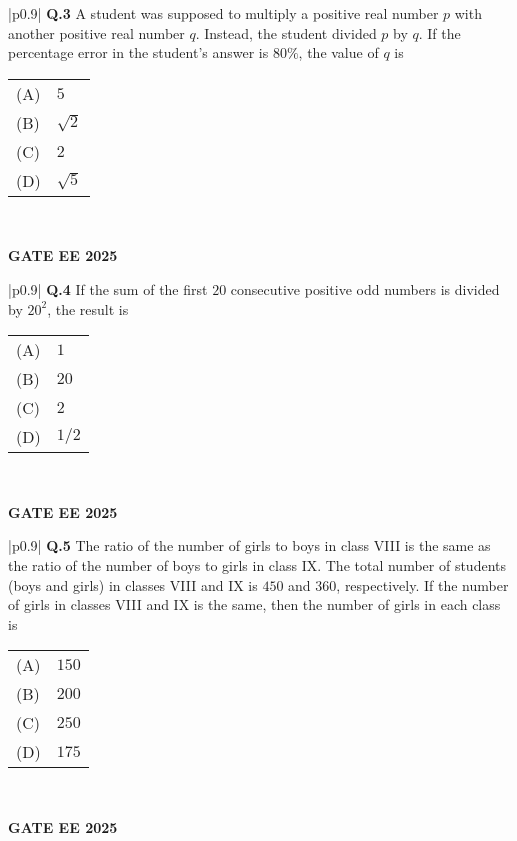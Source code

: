 \documentclass{article}
\begin{document}
\begin{table}[h]
\centering
\begin{tabular}{|p{0.9\linewidth}|}
\hline
\textbf{Q.3} A student was supposed to multiply a positive real number $p$ with another positive real number $q$. Instead, the student divided $p$ by $q$. If the percentage error in the student's answer is $80\%$, the value of $q$ is \\
\hline
\begin{tabular}{ll}
(A) & $5$ \\
(B) & $\sqrt{2}$ \\
(C) & $2$ \\
(D) & $\sqrt{5}$ \\
\end{tabular} \\
\hline
\end{tabular}
\end{table}
\textbf{GATE EE 2025}

\begin{table}[h]
\centering
\begin{tabular}{|p{0.9\linewidth}|}
\hline
\textbf{Q.4} If the sum of the first $20$ consecutive positive odd numbers is divided by $20^2$, the result is \\
\hline
\begin{tabular}{ll}
(A) & $1$ \\
(B) & $20$ \\
(C) & $2$ \\
(D) & $1/2$ \\
\end{tabular} \\
\hline
\end{tabular}
\end{table}
\textbf{GATE EE 2025}

\begin{table}[h]
\centering
\begin{tabular}{|p{0.9\linewidth}|}
\hline
\textbf{Q.5} The ratio of the number of girls to boys in class VIII is the same as the ratio of the number of boys to girls in class IX. The total number of students (boys and girls) in classes VIII and IX is $450$ and $360$, respectively. If the number of girls in classes VIII and IX is the same, then the number of girls in each class is \\
\hline
\begin{tabular}{ll}
(A) & $150$ \\
(B) & $200$ \\
(C) & $250$ \\
(D) & $175$ \\
\end{tabular} \\
\hline
\end{tabular}
\end{table}
\textbf{GATE EE 2025}
\end{document}
